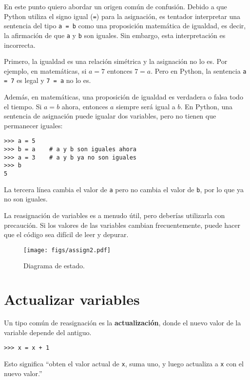 \documentclass[10pt]{book}
\begin{document}
En este punto quiero abordar un origen común de
confusión.
Debido a que Python utiliza el signo igual ({\tt =}) para la asignación, es
tentador interpretar una sentencia del tipo {\tt a = b} como una
proposición
matemática de igualdad, es decir, la afirmación de que {\tt a} y
{\tt b} son iguales.  Sin embargo, esta interpretación es incorrecta.

Primero, la igualdad es una relación simétrica y la asignación no lo es.  Por
ejemplo, en matemáticas, si $a=7$ entonces $7=a$.  Pero en Python, la
sentencia {\tt a = 7} es legal y {\tt 7 = a} no lo es.

Además, en matemáticas, una proposición de igualdad es verdadera o
falsa todo el tiempo.  Si $a=b$ ahora, entonces $a$ siempre será igual a $b$.
En Python, una sentencia de asignación puede igualar dos variables, pero
no tienen que permanecer iguales:

\begin{verbatim}
>>> a = 5
>>> b = a    # a y b son iguales ahora
>>> a = 3    # a y b ya no son iguales
>>> b
5
\end{verbatim}
%
La tercera línea cambia el valor de {\tt a} pero no cambia el
valor de {\tt b}, por lo que ya no son iguales.

La reasignación de variables es a menudo útil, pero deberías utilizarla
con precaución.  Si los valores de las variables cambian frecuentemente, puede
hacer que el código sea difícil de leer y depurar.

\begin{figure}
\centerline
{\texttt{[image: figs/assign2.pdf]}}
\caption{Diagrama de estado.}
\label{fig.assign2}
\end{figure}



\section{Actualizar variables}
\label{update}


Un tipo común de reasignación es la {\bf actualización},
donde el nuevo valor de la variable depende del antiguo.

\begin{verbatim}
>>> x = x + 1
\end{verbatim}
%
Esto significa ``obten el valor actual de {\tt x}, suma uno, y luego
actualiza a {\tt x} con el nuevo valor.''
\end{document}
